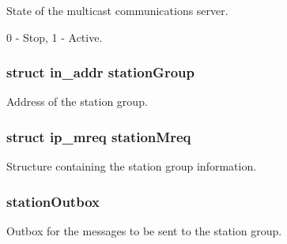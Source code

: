 State of the multicast communications server. 

0 -\/ Stop, 1 -\/ Active. 
\subsubsection[{\texorpdfstring{station\+Group}{stationGroup}}]{\setlength{\rightskip}{0pt plus 5cm}struct in\+\_\+addr station\+Group}\hypertarget{struct_m_c_m__server_stats_a7bfb05adb1764967eb907ead42f1ef70}{}\label{struct_m_c_m__server_stats_a7bfb05adb1764967eb907ead42f1ef70}


Address of the station group. 

\subsubsection[{\texorpdfstring{station\+Mreq}{stationMreq}}]{\setlength{\rightskip}{0pt plus 5cm}struct ip\+\_\+mreq station\+Mreq}\hypertarget{struct_m_c_m__server_stats_aae161e5b6e12fa4eb0e8ec3917b20966}{}\label{struct_m_c_m__server_stats_aae161e5b6e12fa4eb0e8ec3917b20966}


Structure containing the station group information. 

\subsubsection[{\texorpdfstring{station\+Outbox}{stationOutbox}}]{ station\+Outbox}\hypertarget{struct_m_c_m__server_stats_a4f52de38b5ec7a177a7bc9fe74d710f9}{}\label{struct_m_c_m__server_stats_a4f52de38b5ec7a177a7bc9fe74d710f9}


Outbox for the messages to be sent to the station group. 

